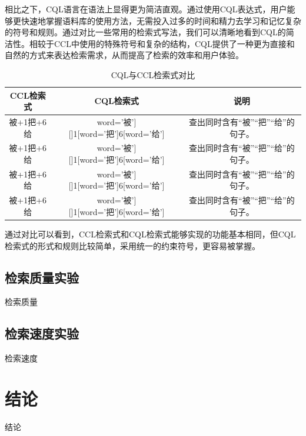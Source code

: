 \documentclass[11pt]{article}
\begin{document}
\begin{CJK*}{UTF8}{gbsn}
相比之下，CQL语言在语法上显得更为简洁直观。通过使用CQL表达式，用户能够更快速地掌握语料库的使用方法，无需投入过多的时间和精力去学习和记忆复杂的符号和规则。通过对比一些常用的检索式写法，我们可以清晰地看到CQL的简洁性。相较于CCL中使用的特殊符号和复杂的结构，CQL提供了一种更为直接和自然的方式来表达检索需求，从而提高了检索的效率和用户体验。


\begin{table}[h]
	\begin{center}
		\begin{tabular}{|c|c|c|}
			\hline \bf CCL检索式 & \bf CQL检索式 & \bf 说明 \\ \hline
			被+1把+6给 & word='被'][]{1}[word='把']{6}[word='给'] & 查出同时含有“被”“把”“给”的句子。 \\
			被+1把+6给 & word='被'][]{1}[word='把']{6}[word='给'] & 查出同时含有“被”“把”“给”的句子。 \\
			被+1把+6给 & word='被'][]{1}[word='把']{6}[word='给'] & 查出同时含有“被”“把”“给”的句子。 \\
			被+1把+6给 & word='被'][]{1}[word='把']{6}[word='给'] & 查出同时含有“被”“把”“给”的句子。 \\
			\hline
		\end{tabular}
	\end{center}
	\caption{\label{font-table} CQL与CCL检索式对比}
\end{table}

通过对比可以看到，CCL检索式和CQL检索式能够实现的功能基本相同，但CQL检索式的形式和规则比较简单，采用统一的约束符号，更容易被掌握。

\subsection{检索质量实验}

检索质量

\subsection{检索速度实验}

检索速度

\section{结论}

结论


%
%

\begin{thebibliography}{}


\end{thebibliography}
\end{CJK*}
\end{document}
